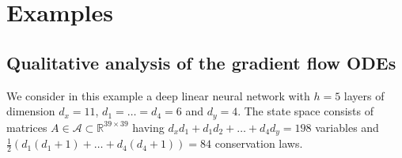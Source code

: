 \documentclass{article}
\newcommand{\1}{\mathds{1}}
\begin{document}
\section{Examples}
\label{sec:examples}


\subsection{Qualitative analysis of the gradient flow ODEs}
\label{sec:ex-qualitat-anal}

We consider in this example a deep linear neural network with $h=5 $ layers of dimension $ d_x =11$, $ d_1=\ldots = d_4 =6$ and $ d_y =4 $. 
The state space consists of matrices $A \in \mathcal{A}\subset \mathbb{R}^{39 \times 39} $ having $ d_x d_1 + d_1 d_2 + \ldots + d_{4} d_y =198$ variables and  $  \frac{1}{2} \left(  d_1(d_1+1) + \ldots + d_{4} (d_4+1)\right) =84 $ conservation laws. 
\end{document}
